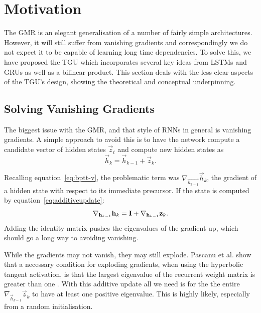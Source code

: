 \section{Motivation}
The GMR is an elegant generalisation of a number of fairly simple architectures. However, it will
still suffer from vanishing gradients and correspondingly we do not expect it to be capable of
learning long time dependencies. To solve this, we have proposed the TGU which incorporates several
key ideas from LSTMs and GRUs as well as a bilinear product. This section deals with the less clear
aspects of the TGU's design, showing the theoretical and conceptual underpinning.

\subsection{Solving Vanishing Gradients}\label{sec:additive}
The biggest issue with the GMR, and that style of RNNs in general is vanishing gradients.
A simple approach to avoid this
 is to have the network compute a candidate vector of hidden states
\(\vec{z}_t\) and compute new hidden states as
\begin{equation}\label{eq:additiveupdate}
	\vec{h}_k = \vec{h}_{k-1} + \vec{z}_k.
\end{equation}

Recalling equation~\eqref{eq:bptt-v}, the problematic term was \(\nabla_{\vec{h_{k-1}}}\vec{h}_k\),
the gradient of a hidden state with respect to its immediate precursor. If the state is computed by
equation~\eqref{eq:additiveupdate}:
\begin{equation}
	\nabla_{\mathbf{h}_{k-1}}\mathbf{h}_k = \mathbf{I} + \nabla_{\mathbf{h}_{k-1}}\mathbf{z}_k.
\end{equation} Adding the identity matrix pushes the eigenvalues of the gradient up, which should go
a long way to avoiding vanishing.

While the gradients may not vanish, they may still explode. Pascanu et al. show that a necessary
condition for exploding gradients, when using the hyperbolic tangent activation, is that the largest
eigenvalue of the recurrent weight matrix is greater than one \autocite{Pascanu2012}. With this
additive update all we need is for the the entire
\(\nabla_{\vec{h}_{k-1}}\vec{z}_ k\) to have at least one positive eigenvalue. This is highly likely,
especially from a random initialisation.

